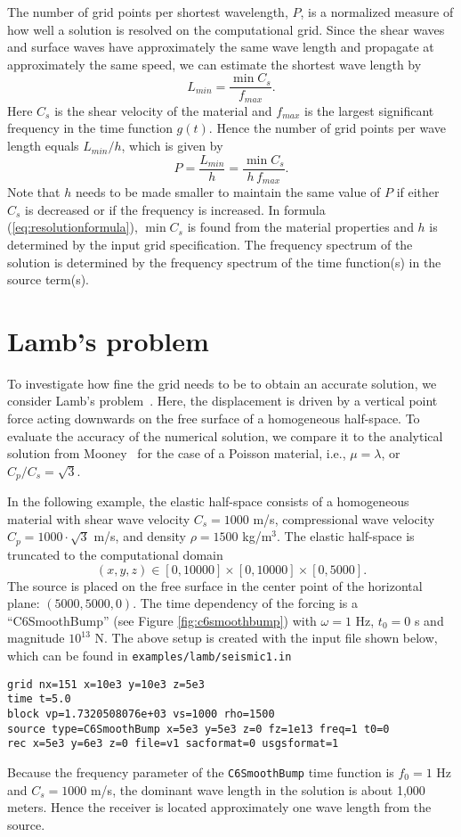 \documentclass[11pt]{report}
\begin{document}
The number of grid points per shortest wavelength, $P$, is a normalized measure of how well a
solution is resolved on the computational grid. Since the shear waves and surface waves have
approximately the same wave length and propagate at approximately the same speed, we can estimate
the shortest wave length by
\[
 L_{min} = \dfrac{\min C_s}{f_{max}}.
\]
Here $C_s$ is the shear velocity of the material and $f_{max}$ is the largest significant frequency
in the time function $g(t)$. Hence the number of grid points per wave length equals $L_{min}/h$,
which is given by
%
\begin{equation}\label{eq:resolutionformula}
  P = \frac{L_{min}}{h} = \dfrac{\min C_s}{h\,f_{max}}. 
\end{equation}
Note that $h$ needs to be made smaller to maintain the same value of $P$ if either $C_s$ is
decreased or if the frequency is increased. In formula (\ref{eq:resolutionformula}), $\min C_s$ is
found from the material properties and $h$ is determined by the input grid specification.  The
frequency spectrum of the solution is determined by the frequency spectrum of the time
function(s) in the source term(s).

\section{Lamb's problem}
To investigate how fine the grid needs to be to obtain an accurate solution, we consider Lamb's
problem~\cite{Lamb_1904}. Here, the displacement is driven by a vertical point force acting
downwards on the free surface of a homogeneous half-space. To evaluate the accuracy of the numerical
solution, we compare it to the analytical solution from Mooney~\cite{Mooney_1974} for the case of a
Poisson material, i.e., $\mu=\lambda$, or $C_p/C_s=\sqrt{3}$.

In the following example, the elastic half-space consists of a homogeneous material with shear wave
velocity $C_s=1000$ m/s, compressional wave velocity $C_p=1000\cdot\sqrt{3}$ m/s, and density $\rho=1500$
kg/m$^3$. The elastic half-space is truncated to the computational domain
\[
(x,y,z) \in [0,10000] \times [0,10000]\times[0,5000].
\]
The source is placed on the free surface in the center point of the horizontal plane:
$(5000,5000,0)$. The time dependency of the forcing is a ``C6SmoothBump'' (see Figure
\ref{fig:c6smoothbump}) with $\omega=1$ Hz, $t_0=0$ s and magnitude $10^{13}$ N. The above setup is
created with the input file shown below, which can be found in {\tt examples/lamb/seismic1.in}
\begin{verbatim}
grid nx=151 x=10e3 y=10e3 z=5e3
time t=5.0
block vp=1.7320508076e+03 vs=1000 rho=1500
source type=C6SmoothBump x=5e3 y=5e3 z=0 fz=1e13 freq=1 t0=0
rec x=5e3 y=6e3 z=0 file=v1 sacformat=0 usgsformat=1
\end{verbatim}
Because the frequency parameter of the {\tt C6SmoothBump} time function is $f_0=1$ Hz and $C_s=1000$
m/s, the dominant wave length in the solution is about 1,000 meters. Hence the receiver is located
approximately one wave length from the source.
\end{document}
